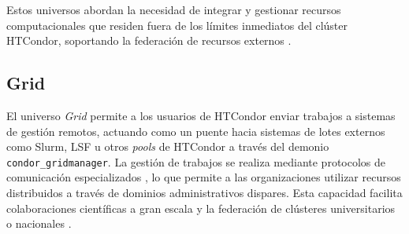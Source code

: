 Estos universos abordan la necesidad de integrar y gestionar recursos computacionales que residen fuera de los límites inmediatos del clúster HTCondor, soportando la federación de recursos externos  \citep{Padmanabhan2011}.

\subsection{Grid}

El universo \textit{Grid} permite a los usuarios de HTCondor enviar trabajos a sistemas de gestión remotos, actuando como un puente hacia sistemas de lotes externos como Slurm, LSF u otros \textit{pools} de HTCondor a través del demonio \texttt{condor\_gridmanager}. La gestión de trabajos se realiza mediante protocolos de comunicación especializados \citep{HTCondor-Grid-universe}, lo que permite a las organizaciones utilizar recursos distribuidos a través de dominios administrativos dispares. Esta capacidad facilita colaboraciones científicas a gran escala y la federación de clústeres universitarios o nacionales \citep{Padmanabhan2011}.
